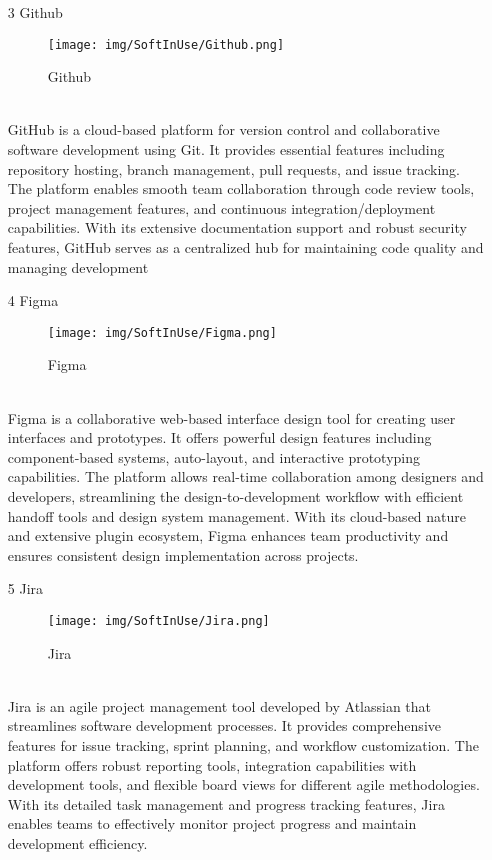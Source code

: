 \documentclass[conference]{IEEEtran}
\begin{document}
\begin{enumerate}
\begin{itemize}
\begin{itemize}
\begin{enumerate}
\begin{enumerate}
\item[3] Github
\begin{figure}[h]
\centering
\texttt{[image: img/SoftInUse/Github.png]}
\caption{Github} 
\end{figure}\\
GitHub is a cloud-based platform for version control and collaborative software development using Git. It provides essential features including repository hosting, branch management, pull requests, and issue tracking. The platform enables smooth team collaboration through code review tools, project management features, and continuous integration/deployment capabilities. With its extensive documentation support and robust security features, GitHub serves as a centralized hub for maintaining code quality and managing development \\

\item[4] Figma
\begin{figure}[h]
\centering
\texttt{[image: img/SoftInUse/Figma.png]}
\caption{Figma} 
\end{figure}\\
Figma is a collaborative web-based interface design tool for creating user interfaces and prototypes. It offers powerful design features including component-based systems, auto-layout, and interactive prototyping capabilities. The platform allows real-time collaboration among designers and developers, streamlining the design-to-development workflow with efficient handoff tools and design system management. With its cloud-based nature and extensive plugin ecosystem, Figma enhances team productivity and ensures consistent design implementation across projects.\\

\item[5] Jira
\begin{figure}[h]
\centering
\texttt{[image: img/SoftInUse/Jira.png]}
\caption{Jira} 
\end{figure}\\
Jira is an agile project management tool developed by Atlassian that streamlines software development processes. It provides comprehensive features for issue tracking, sprint planning, and workflow customization. The platform offers robust reporting tools, integration capabilities with development tools, and flexible board views for different agile methodologies. With its detailed task management and progress tracking features, Jira enables teams to effectively monitor project progress and maintain development efficiency.\\



\end{enumerate}
\end{enumerate}
\end{itemize}
\end{itemize}
\end{enumerate}
\end{document}
